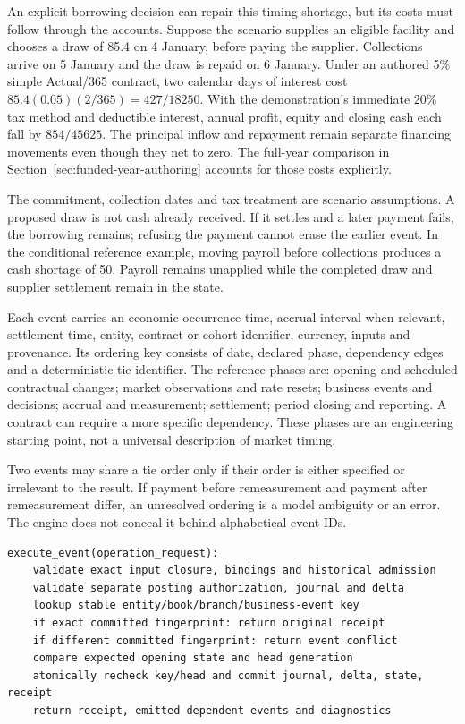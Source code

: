 An explicit borrowing decision can repair this timing shortage, but its costs
must follow through the accounts. Suppose the scenario supplies an eligible
facility and chooses a draw of 85.4 on 4 January, before paying the supplier.
Collections arrive on 5 January and the draw is repaid on 6 January. Under an
authored 5\% simple Actual/365 contract, two calendar days of interest cost
\(85.4(0.05)(2/365)=427/18250\). With the demonstration's immediate 20\% tax
method and deductible interest, annual profit, equity and closing cash each
fall by \(854/45625\). The principal inflow and repayment remain separate
financing movements even though they net to zero. The full-year comparison
in Section~\ref{sec:funded-year-authoring} accounts for those costs explicitly.

The commitment, collection dates and tax treatment are scenario assumptions.
A proposed draw is not cash already received. If it settles and a later
payment fails, the borrowing remains; refusing the payment cannot erase the
earlier event. In the conditional reference example, moving payroll before
collections produces a cash shortage of 50. Payroll remains unapplied while
the completed draw and supplier settlement remain in the state.

Each event carries an economic occurrence time, accrual interval when relevant,
settlement time, entity, contract or cohort identifier, currency, inputs and
provenance. Its ordering key consists of date, declared phase, dependency edges
and a deterministic tie identifier. The reference phases are: opening and
scheduled contractual changes; market observations and rate resets; business
events and decisions; accrual and measurement; settlement; period closing and
reporting. A contract can require a more specific dependency. These phases are
an engineering starting point, not a universal description of market timing.

Two events may share a tie order only if their order is either specified or
irrelevant to the result. If payment before remeasurement and payment after
remeasurement differ, an unresolved ordering is a model ambiguity or an error.
The engine does not conceal it behind alphabetical event IDs.

\begin{lstlisting}
execute_event(operation_request):
    validate exact input closure, bindings and historical admission
    validate separate posting authorization, journal and delta
    lookup stable entity/book/branch/business-event key
    if exact committed fingerprint: return original receipt
    if different committed fingerprint: return event conflict
    compare expected opening state and head generation
    atomically recheck key/head and commit journal, delta, state, receipt
    return receipt, emitted dependent events and diagnostics
\end{lstlisting}

